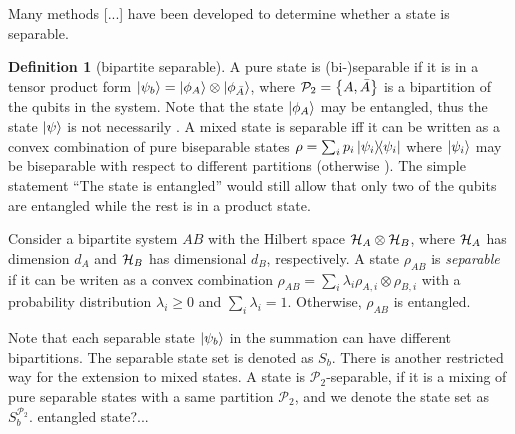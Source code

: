 \documentclass[
10pt,
aps,
pra,
linenumbers,
floatfix,
]{revtex4-2}
\theoremstyle{plain}
\theoremstyle{definition}
\newtheorem{definition}{Definition}
\newtheorem{example}{Example}
\newcommand{\ppartition}{\mathcal{P}}
\newcommand{\dm}{\rho}
\begin{document}
Many methods [...] have been developed to determine whether a state is separable.
\begin{definition}[bipartite separable]\label{def:bipartite_separable}
	A pure state is (bi-)separable if it is in a tensor product form $\ket{\psi_b}=\ket{\phi_A}\otimes\ket{\phi_{\bar{A}}}$, 
	where $\ppartition_2 = \qty{ A, \bar{A} }$ is a bipartition of the qubits in the system.
	Note that the state $\ket{\phi_A}$ may be entangled, thus the state $\ket{\psi}$ is not necessarily .
	A mixed state is separable iff it can be written as a convex combination of pure biseparable states $\dm=\sum_i p_i \op{\psi_i}$ where $\ket{\psi_i}$ may be biseparable with respect to different partitions (otherwise ).
	The simple statement “The state is entangled” would still allow that only two of the qubits are entangled while the rest is in a product state.

	Consider a bipartite system $AB$ with the Hilbert space $\mathcal{H}_A \otimes \mathcal{H}_B$, where $\mathcal{H}_A$ has dimension $d_A$ and $\mathcal{H}_B$ has dimensional $d_B$, respectively.
	A state $\dm_{AB}$ is \emph{separable} if it can be writen as a convex combination $\dm_{AB}= \sum_i \lambda_i \dm_{A,i} \otimes \dm_{B,i}$ with a probability distribution $\lambda_i\ge 0$ and $\sum_i \lambda_i = 1$. Otherwise, $\dm_{AB}$ is entangled.

	Note that each separable state $\ket{\psi_b}$ in the summation can have different bipartitions.
	The separable state set is denoted as $S_b$.
	There is another restricted way for the extension to mixed states. 
	A state is $\ppartition_2$-separable, if it is a mixing of pure separable states with a same partition $\ppartition_2$, 
	and we denote the state set as $S_b^{\ppartition_2}$. 
	entangled state?...
\end{definition}
\end{document}
